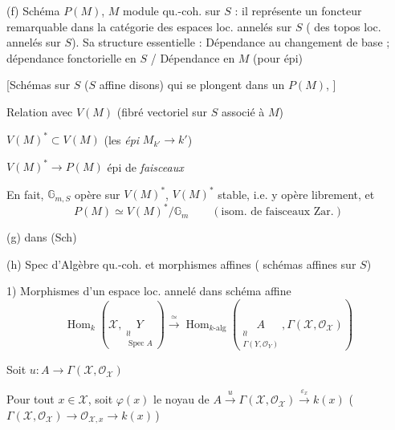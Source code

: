\documentclass[11pt,a4paper]{article}
\begin{document}
(f) Schéma $P(M)$, $M$ module qu.-coh. sur $S$ : il représente un foncteur remarquable \uncertain{\ill{}} dans la catégorie des espaces loc. annelés sur $S$ ( des topos loc. annelés sur $S$). Sa structure essentielle : Dépendance  au changement de base ; dépendance fonctorielle en $S$ / Dépendance en $M$ (pour épi) 


[Schémas   sur $S$ ($S$ affine disons)  qui se plongent dans un $P(M)$, \struck{\ill{}} ]

Relation avec $V(M)$ (fibré vectoriel sur $S$ associé à $M$)

$V(M)^* \subset V(M)$ (les \emph{épi} $M_{k'} \to k'$)

$V(M)^* \longrightarrow P(M)$ \quad épi de \emph{faisceaux} 

En fait, $\mathbb{G}_{m,S}$ opère sur $V(M)^*$,  $V(M)^*$ stable, i.e. y opère librement, et
\[
P(M) \simeq V(M)^* / \mathbb{G}_m \qquad (\text{isom. de faisceaux Zar.})
\]

(g)  dans (Sch)

(h) Spec d'Algèbre qu.-coh. et \struck{\ill{}} morphismes affines ( schémas affines sur $S$)


1) Morphismes d'un espace loc. annelé dans  schéma affine
\[
\operatorname{Hom}_k(\mathcal{X}, \underset{\substack{\wr\wr \\ \operatorname{Spec} A}}{Y}) \xrightarrow{\ \simeq\ } \operatorname{Hom}_{k\text{-alg}}(\underset{\substack{\wr\wr \\ \Gamma(Y, \mathcal{O}_Y)}}{A}, \Gamma(\mathcal{X}, \mathcal{O}_{\mathcal{X}}))
\]

 Soit $u : A \to \Gamma(\mathcal{X}, \mathcal{O}_{\mathcal{X}})$

Pour tout $x \in \mathcal{X}$, soit $\varphi(x)$  \struck{\ill{}} le noyau de $A \xrightarrow{u} \Gamma(\mathcal{X}, \mathcal{O}_{\mathcal{X}}) \xrightarrow{\varepsilon_x} k(x)$ \quad (\,$\Gamma(\mathcal{X}, \mathcal{O}_{\mathcal{X}}) \to \mathcal{O}_{\mathcal{X},x} \to k(x)$\,)
\end{document}
